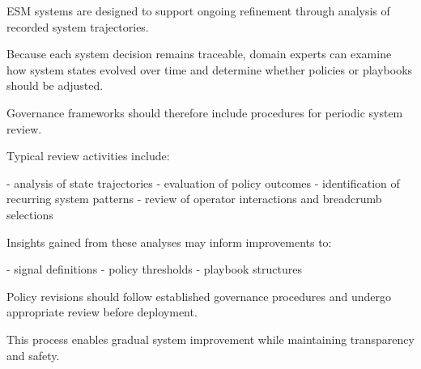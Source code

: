 ESM systems are designed to support ongoing refinement through analysis of recorded system trajectories.

Because each system decision remains traceable, domain experts can examine how system states evolved over time and determine whether policies or playbooks should be adjusted.

Governance frameworks should therefore include procedures for periodic system review.

Typical review activities include:

- analysis of state trajectories
- evaluation of policy outcomes
- identification of recurring system patterns
- review of operator interactions and breadcrumb selections

Insights gained from these analyses may inform improvements to:

- signal definitions
- policy thresholds
- playbook structures

Policy revisions should follow established governance procedures and undergo appropriate review before deployment.

This process enables gradual system improvement while maintaining transparency and safety.
